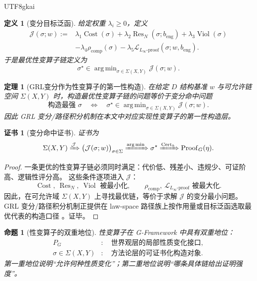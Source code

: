\documentclass[12pt]{article}
\newtheorem{definition}{定义}[section]
\newtheorem{theorem}{定理}[section]
\newtheorem{proposition}{命题}[section]
\newtheorem{Certificate}{证书}[section]
\newcommand{\GFramework}{\textsf{G-Framework}}
\newcommand{\Linfty}{\ensuremath{L_\infty}}
\newcommand{\Cert}{\operatorname{Cert}}
\newcommand{\Proof}{\operatorname{Proof}}
\newcommand{\Res}{\operatorname{Res}}
\newcommand{\Cost}{\operatorname{Cost}}
\newcommand{\Viol}{\operatorname{Viol}}
\DeclareMathOperator*{\argmin}{arg\,min}
\begin{document}
\begin{CJK*}{UTF8}{gkai}
\begin{definition}[变分目标泛函]
给定权重 $\lambda_i\ge0$，定义
\[
\begin{aligned}
  \mathcal J(\sigma;w)
  :=
  &\lambda_1\Cost(\sigma)
  +\lambda_2\Res_N(\sigma;b_{\mathrm{eng}})
  +\lambda_3\Viol(\sigma)\\
  &-\lambda_4\rho_{\mathrm{comp}}(\sigma)
  -\lambda_5\mathcal L_{\Linfty\text{-}\mathrm{proof}}(\sigma;w,b_{\mathrm{eng}}).
\end{aligned}
\]
于是最优性变算子链定义为
\[
  \sigma^\star
  \in
  \argmin_{\sigma\in\Sigma(X,Y)}
  \mathcal J(\sigma;w).
\]
\end{definition}

\begin{theorem}[GRL变分作为性变算子的第一性构造]
\label{thm:tex50-grl-variational-construction}
在给定 $D$ 结构基准 $w$ 与可允许链空间 $\Sigma(X,Y)$ 时，构造最优性变算子链的问题等价于变分命中问题
\[
  \text{构造最强 }\sigma
  \quad\Longleftrightarrow\quad
  \sigma^\star\in
  \argmin_{\sigma\in\Sigma(X,Y)}\mathcal J(\sigma;w).
\]
因此 GRL 变分/路径积分机制在本文中对应实现性变算子的第一性构造层。
\end{theorem}

\begin{Certificate}[变分命中证书]
证书为
\[
  \Sigma(X,Y)
  \xRightarrow{\mathcal J}
  \bigl(\mathcal J(\sigma;w)\bigr)_{\sigma\in\Sigma}
  \xRightarrow{\argmin}
  \sigma^\star
  \xRightarrow{\Cert_h}
  \Proof_G(\eta).
\]
\end{Certificate}

\begin{proof}
一条更优的性变算子链必须同时满足：代价低、残差小、违规少、可证阶高、逻辑性评分高。
这些条件逐项进入 $\mathcal J$：
\[
  \Cost,\ \Res_N,\ \Viol
  \text{ 被最小化},\qquad
  \rho_{\mathrm{comp}},\ \mathcal L_{\Linfty\text{-}\mathrm{proof}}
  \text{ 被最大化}.
\]
因此，在可允许域 $\Sigma(X,Y)$ 上寻找最优链，等价于求解 $\mathcal J$ 的变分最小问题。
GRL 变分/路径积分机制正提供在 law-space 路径族上按作用量或目标泛函选取最优代表的构造口径
\cite{GaoZhengAppVol1,GaoZhengAppVol3}。证毕。
\end{proof}

\begin{proposition}[性变算子的双重地位]
\label{prop:tex50-operator-dual-status}
性变算子在 \GFramework{} 中具有双重地位：
\[
\begin{aligned}
  P_G&:\quad \text{世界观层的局部性质变化接口},\\
  \sigma\in\Sigma(X,Y)&:\quad \text{方法论层的可证书化构造对象}.
\end{aligned}
\]
第一重地位说明“允许何种性质变化”；第二重地位说明“哪条具体链给出证明强度”。
\end{proposition}


\end{CJK*}
\end{document}

